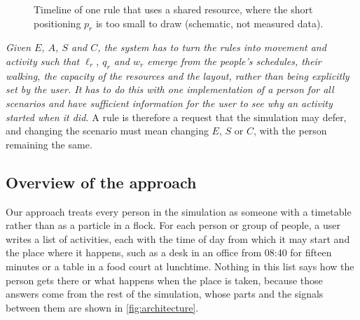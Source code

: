 \begin{figure}[H]
\centering
{}
\caption[Timeline of one rule that uses a shared resource]{Timeline of one rule that uses a shared resource, where the short positioning $p_r$ is too small to draw (schematic, not measured data).}
\label{fig:problem-timeline}
\end{figure}

\emph{Given $E$, $A$, $S$ and $C$, the system has to turn the rules into movement and activity such that $\ell_r$, $q_r$ and $w_r$ emerge from the people's schedules, their walking, the capacity of the resources and the layout, rather than being explicitly set by the user. It has to do this with one implementation of a person for all scenarios and have sufficient information for the user to see why an activity started when it did.} A rule is therefore a request that the simulation may defer, and changing the scenario must mean changing $E$, $S$ or $C$, with the person remaining the same.

\subsection{Overview of the approach}\label{sub:problem-overview}

Our approach treats every person in the simulation as someone with a timetable rather than as a particle in a flock. For each person or group of people, a user writes a list of activities, each with the time of day from which it may start and the place where it happens, such as a desk in an office from 08:40 for fifteen minutes or a table in a food court at lunchtime. Nothing in this list says how the person gets there or what happens when the place is taken, because those answers come from the rest of the simulation, whose parts and the signals between them are shown in \cref{fig:architecture}.

